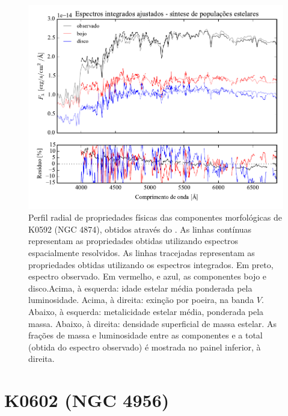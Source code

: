 \begin{figure}
	\includegraphics[page=6]{figuras/sample006a_synthesis}
	\caption[Propriedades físicas das componentes morfológicas de K0592 (NGC 4874)]
	{Perfil radial de propriedades físicas das componentes morfológicas de
	K0592 (NGC 4874), obtidos através do \starlight. As linhas contínuas
	representam as propriedades obtidas utilizando espectros espacialmente
	resolvidos. As linhas tracejadas representam as propriedades obtidas utilizando
	os espectros integrados. Em preto, espectro observado. Em vermelho, e azul, as
	componentes bojo e disco.Acima, à esquerda: idade estelar média ponderada pela
	luminosidade. Acima, à direita: exinção por poeira, na banda $V$. Abaixo, à
	esquerda: metalicidade estelar média, ponderada pela massa. Abaixo, à direita:
	densidade superficial de massa estelar. As frações de massa e luminosidade
	entre as componentes e a total (obtida do espectro observado) é mostrada no
	painel inferior, à direita.}
	\label{fig:decompSinteseRadprof:K0592}
\end{figure}


\section{K0602 (NGC 4956)}
\label{apendice:Decomp:K0602}

